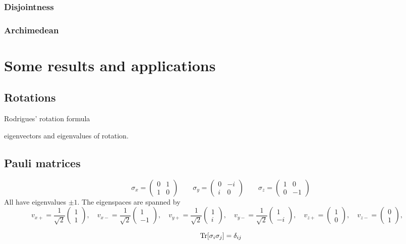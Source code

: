 \subsection{Disjointness}

\subsection{Archimedean}

\chapter{Some results and applications}
\section{Rotations}
Rodrigues' rotation formula

eigenvectors and eigenvalues of rotation.
\section{Pauli matrices}

\[ \sigma_x = \begin{pmatrix}
0 & 1 \\ 1 & 0
\end{pmatrix} \qquad \sigma_y = \begin{pmatrix}
0 & -i \\ i & 0
\end{pmatrix} \qquad \sigma_z = \begin{pmatrix}
1 & 0 \\ 0 & -1
\end{pmatrix} \]
All have eigenvalues $\pm 1$. The eigenspaces are spanned by
\[ v_{x+} = \frac{1}{\sqrt{2}}\begin{pmatrix}
1 \\ 1
\end{pmatrix}, \quad v_{x-} = \frac{1}{\sqrt{2}}\begin{pmatrix}
1 \\ -1
\end{pmatrix}, \quad v_{y+} = \frac{1}{\sqrt{2}}\begin{pmatrix}
1 \\ i
\end{pmatrix}, \quad v_{y-} = \frac{1}{\sqrt{2}}\begin{pmatrix}
1 \\ -i
\end{pmatrix}, \quad v_{z+} = \begin{pmatrix}
1 \\ 0
\end{pmatrix}, \quad v_{z-} = \begin{pmatrix}
0 \\ 1
\end{pmatrix}, \quad  \]

\[ \operatorname{Tr}[\sigma_i \sigma_j] = \delta_{ij} \]

